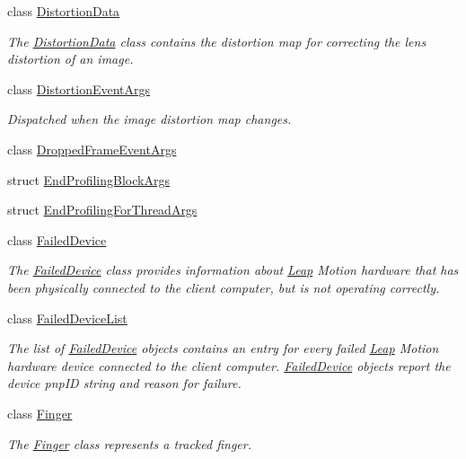 \begin{DoxyCompactItemize}
class \mbox{\hyperlink{class_leap_1_1_distortion_data}{Distortion\+Data}}
\begin{DoxyCompactList}\small\item\em The \mbox{\hyperlink{class_leap_1_1_distortion_data}{Distortion\+Data}} class contains the distortion map for correcting the lens distortion of an image. \end{DoxyCompactList}\item 
class \mbox{\hyperlink{class_leap_1_1_distortion_event_args}{Distortion\+Event\+Args}}
\begin{DoxyCompactList}\small\item\em Dispatched when the image distortion map changes. \end{DoxyCompactList}\item 
class \mbox{\hyperlink{class_leap_1_1_dropped_frame_event_args}{Dropped\+Frame\+Event\+Args}}
\item 
struct \mbox{\hyperlink{struct_leap_1_1_end_profiling_block_args}{End\+Profiling\+Block\+Args}}
\item 
struct \mbox{\hyperlink{struct_leap_1_1_end_profiling_for_thread_args}{End\+Profiling\+For\+Thread\+Args}}
\item 
class \mbox{\hyperlink{class_leap_1_1_failed_device}{Failed\+Device}}
\begin{DoxyCompactList}\small\item\em The \mbox{\hyperlink{class_leap_1_1_failed_device}{Failed\+Device}} class provides information about \mbox{\hyperlink{namespace_leap}{Leap}} Motion hardware that has been physically connected to the client computer, but is not operating correctly. \end{DoxyCompactList}\item 
class \mbox{\hyperlink{class_leap_1_1_failed_device_list}{Failed\+Device\+List}}
\begin{DoxyCompactList}\small\item\em The list of \mbox{\hyperlink{class_leap_1_1_failed_device}{Failed\+Device}} objects contains an entry for every failed \mbox{\hyperlink{namespace_leap}{Leap}} Motion hardware device connected to the client computer. \mbox{\hyperlink{class_leap_1_1_failed_device}{Failed\+Device}} objects report the device pnp\+ID string and reason for failure. \end{DoxyCompactList}\item 
class \mbox{\hyperlink{class_leap_1_1_finger}{Finger}}
\begin{DoxyCompactList}\small\item\em The \mbox{\hyperlink{class_leap_1_1_finger}{Finger}} class represents a tracked finger. \end{DoxyCompactList}\item 

\end{DoxyCompactItemize}
